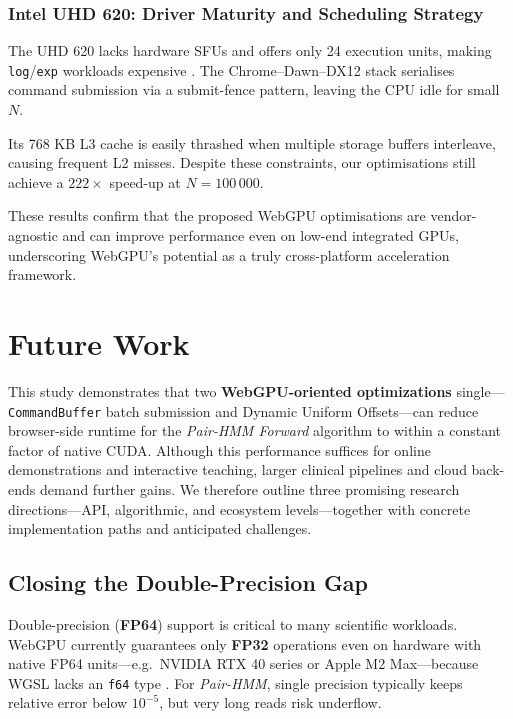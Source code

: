 \documentclass[PhD]{PHlab-thesis}
\begin{document}
\subsection{Intel UHD 620: Driver Maturity and Scheduling Strategy}
The UHD 620 lacks hardware SFUs and offers only 24 execution units, making \texttt{log}/\texttt{exp} workloads expensive \cite{Intel2018-uhd620}.  
The Chrome–Dawn–DX12 stack serialises command submission via a submit-fence pattern, leaving the CPU idle for small $N$.

Its 768 KB L3 cache is easily thrashed when multiple storage buffers interleave, causing frequent L2 misses.  
Despite these constraints, our optimisations still achieve a $222\times$ speed-up at $N = 100\,000$.

These results confirm that the proposed WebGPU optimisations are vendor-agnostic and can improve performance even on low-end integrated GPUs, underscoring WebGPU's potential as a truly cross-platform acceleration framework.





\chapter{Future Work}

This study demonstrates that two \textbf{WebGPU-oriented optimizations} single—\texttt{CommandBuffer} batch submission and Dynamic Uniform Offsets—can reduce browser-side runtime for the \emph{Pair-HMM Forward} algorithm to within a constant factor of native CUDA. Although this performance suffices for online demonstrations and interactive teaching, larger clinical pipelines and cloud back-ends demand further gains. We therefore outline three promising research directions—API, algorithmic, and ecosystem levels—together with concrete implementation paths and anticipated challenges.

\section{Closing the Double-Precision Gap}

Double-precision (\textbf{FP64}) support is critical to many scientific workloads. WebGPU currently guarantees only \textbf{FP32} operations even on hardware with native FP64 units—e.g.\ NVIDIA RTX 40 series or Apple M2 Max—because WGSL lacks an \texttt{f64} type \cite{W3C2024-webgpu,NVIDIA2023-cudaguide,Apple2023-m2max}. For \emph{Pair-HMM}, single precision typically keeps relative error below $10^{-5}$, but very long reads risk underflow.
\end{document}
